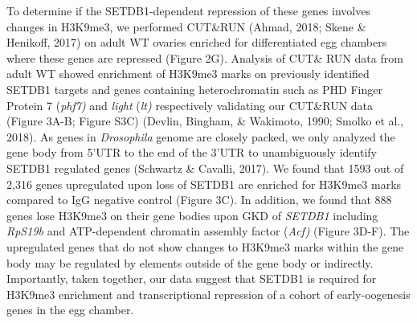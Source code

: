 \documentclass[12pt,oneside]{reedthesis}
\begin{document}
To determine if the SETDB1-dependent repression of these genes involves changes in H3K9me3, we performed CUT\&RUN (Ahmad, 2018; Skene \& Henikoff, 2017) on adult WT ovaries enriched for differentiated egg chambers where these genes are repressed (Figure 2G). Analysis of CUT\& RUN data from adult WT showed enrichment of H3K9me3 marks on previously identified SETDB1 targets and genes containing heterochromatin such as PHD Finger Protein 7 (\emph{phf7)} and \emph{light} (\emph{lt)} respectively validating our CUT\&RUN data (Figure 3A-B; Figure S3C) (Devlin, Bingham, \& Wakimoto, 1990; Smolko et al., 2018). As genes in \emph{Drosophila} genome are closely packed, we only analyzed the gene body from 5'UTR to the end of the 3'UTR to unambiguously identify SETDB1 regulated genes (Schwartz \& Cavalli, 2017). We found that 1593 out of 2,316 genes upregulated upon loss of SETDB1 are enriched for H3K9me3 marks compared to IgG negative control (Figure 3C). In addition, we found that 888 genes lose H3K9me3 on their gene bodies upon GKD of \emph{SETDB1} including \emph{RpS19b} and ATP-dependent chromatin assembly factor (\emph{Acf)} (Figure 3D-F). The upregulated genes that do not show changes to H3K9me3 marks within the gene body may be regulated by elements outside of the gene body or indirectly. Importantly, taken together, our data suggest that SETDB1 is required for H3K9me3 enrichment and transcriptional repression of a cohort of early-oogenesis genes in the egg chamber.
\end{document}
